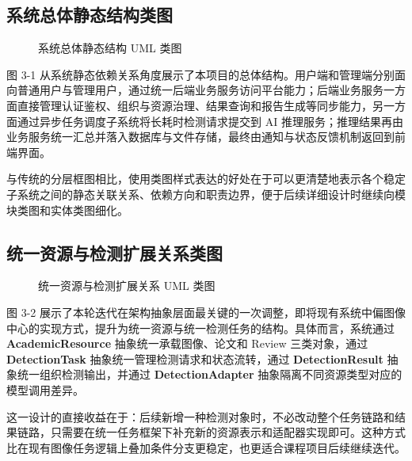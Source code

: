 \subsection{系统总体静态结构类图}
\begin{figure}[H]
    \centering
    \resizebox{0.98\textwidth}{!}{}
    \caption{系统总体静态结构 UML 类图}
\end{figure}

图 3-1 从系统静态依赖关系角度展示了本项目的总体结构。用户端和管理端分别面向普通用户与管理用户，通过统一后端业务服务访问平台能力；后端业务服务一方面直接管理认证鉴权、组织与资源治理、结果查询和报告生成等同步能力，另一方面通过异步任务调度子系统将长耗时检测请求提交到 AI 推理服务；推理结果再由业务服务统一汇总并落入数据库与文件存储，最终由通知与状态反馈机制返回到前端界面。

与传统的分层框图相比，使用类图样式表达的好处在于可以更清楚地表示各个稳定子系统之间的静态关联关系、依赖方向和职责边界，便于后续详细设计时继续向模块类图和实体类图细化。

\subsection{统一资源与检测扩展关系类图}
\begin{figure}[H]
    \centering
    \resizebox{0.98\textwidth}{!}{}
    \caption{统一资源与检测扩展关系 UML 类图}
\end{figure}

图 3-2 展示了本轮迭代在架构抽象层面最关键的一次调整，即将现有系统中偏图像中心的实现方式，提升为统一资源与统一检测任务的结构。具体而言，系统通过 \textbf{AcademicResource} 抽象统一承载图像、论文和 Review 三类对象，通过 \textbf{DetectionTask} 抽象统一管理检测请求和状态流转，通过 \textbf{DetectionResult} 抽象统一组织检测输出，并通过 \textbf{DetectionAdapter} 抽象隔离不同资源类型对应的模型调用差异。

这一设计的直接收益在于：后续新增一种检测对象时，不必改动整个任务链路和结果链路，只需要在统一任务框架下补充新的资源表示和适配器实现即可。这种方式比在现有图像任务逻辑上叠加条件分支更稳定，也更适合课程项目后续继续迭代。


